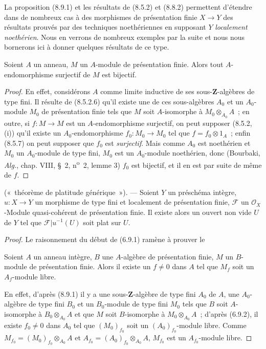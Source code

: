 \begin{env}[8.9.2]
\label{IV.8.9.2-fr}
La proposition (8.9.1) et les résultats de (8.5.2) et (8.8.2) permettent
d'étendre dans de nombreux cas à des morphismes de présentation finie
$X\to Y$ des résultats prouvés par des techniques noethériennes en supposant
$Y$ \emph{localement noethérien}.
Nous en verrons de nombreux exemples par la suite et nous nous bornerons ici
à donner quelques résultats de ce type.
\end{env}

\begin{proposition}[8.9.3]
\label{IV.8.9.3-fr}
Soient $A$ un anneau, $M$ un $A$-module de présentation finie. Alors tout
$A$-endomorphisme surjectif de $M$ est bijectif.
\end{proposition}

\begin{proof}
En effet, considérons $A$ comme limite inductive de ses sous-$\mathbf Z$-algèbres
de type fini. Il résulte de (8.5.2.6) qu'il existe une de ces sous-algèbres
$A_0$ et un $A_0$-module $M_0$ de présentation finie tels que $M$ soit
$A$-isomorphe à $M_0\otimes_{A_0}A$~; en outre, si $f:M\to M$ est un
$A$-endomorphisme surjectif, on peut supposer (8.5.2, (i)) qu'il existe un
$A_0$-endomorphisme $f_0:M_0\to M_0$ tel que $f=f_0\otimes1_A$~; enfin
(8.5.7) on peut supposer que $f_0$ est \emph{surjectif}. Mais comme $A_0$ est
noethérien et $M_0$ un $A_0$-module de type fini, $M_0$ est un $A_0$-module
noethérien, donc (Bourbaki, \emph{Alg.}, chap. VIII, \S~2, n\textsuperscript{o}~2,
lemme 3) $f_0$ est bijectif, et il en est par suite de même de $f$.
\end{proof}

\begin{proposition}[8.9.4]
\label{IV.8.9.4-fr}
(«~théorème de platitude générique~»). --- Soient $Y$ un préschéma intègre,
$u:X\to Y$ un morphisme de type fini et localement de présentation finie,
$\mathcal F$ un $\mathcal O_X$-Module quasi-cohérent de présentation finie. Il
existe alors un ouvert non vide $U$ de $Y$ tel que
$\mathcal F|u^{-1}(U)$ soit plat sur $U$.
\end{proposition}

\begin{proof}
Le raisonnement du début de (6.9.1) ramène à prouver le

\begin{lemma}[8.9.4.1]
\label{IV.8.9.4.1-fr}
Soient $A$ un anneau intègre, $B$ une $A$-algèbre de présentation finie,
$M$ un $B$-module de présentation finie. Alors il existe un $f\neq0$ dans
$A$ tel que $M_f$ soit un $A_f$-module libre.
\end{lemma}

En effet, d'après (8.9.1) il y a une sous-$\mathbf Z$-algèbre de type fini
$A_0$ de $A$, une $A_0$-algèbre de type fini $B_0$ et un $B_0$-module de type
fini $M_0$ tels que $B$ soit $A$-isomorphe à $B_0\otimes_{A_0}A$ et que $M$
soit $B$-isomorphe à $M_0\otimes_{A_0}A$~; d'après (6.9.2), il existe
$f_0\neq0$ dans $A_0$ tel que $(M_0)_{f_0}$ soit un
$(A_0)_{f_0}$-module libre. Comme
$M_{f_0}=(M_0)_{f_0}\otimes_{A_0}A$ et
$A_{f_0}=(A_0)_{f_0}\otimes_{A_0}A$, $M_{f_0}$ est un $A_{f_0}$-module libre.
\end{proof}

